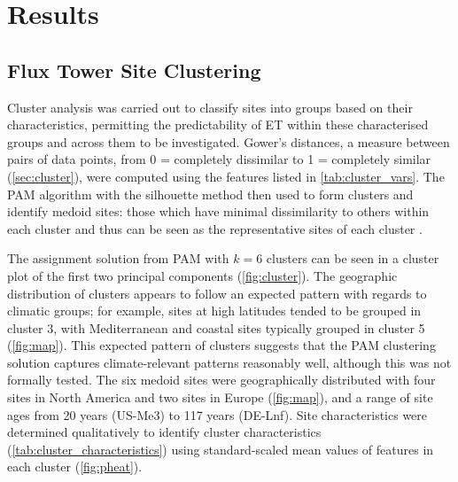 \section{Results}

\subsection{Flux Tower Site Clustering} \label{sec:cluster_res}
Cluster analysis was carried out to classify sites into groups based on their characteristics, permitting the predictability of \ac{ET} within these characterised groups and across them to be investigated. Gower's distances, a measure between pairs of data points, from 0 = completely dissimilar to 1 = completely similar \parencite{gower1971} (\ref{sec:cluster}), were computed using the features listed in \autoref{tab:cluster_vars}. The \ac{PAM} algorithm \parencite{rousseeuw1990} with the silhouette method then used to form clusters and identify medoid sites: those which have minimal dissimilarity to others within each cluster and thus can be seen as the representative sites of each cluster \parencite{schubert2021fast}.
\par The assignment solution from \ac{PAM} with $k = 6$ clusters can be seen in a cluster plot of the first two principal components (\autoref{fig:cluster}). The geographic distribution of clusters appears to follow an expected pattern with regards to climatic groups; for example, sites at high latitudes tended to be grouped in cluster 3, with Mediterranean and coastal sites typically grouped in cluster 5 (\autoref{fig:map}). This expected pattern of clusters suggests that the \ac{PAM} clustering solution captures climate-relevant patterns reasonably well, although this was not formally tested. The six medoid sites were geographically distributed with four sites in North America and two sites in Europe (\autoref{fig:map}), and a range of site ages from 20 years (US-Me3) to 117 years (DE-Lnf). Site characteristics were determined qualitatively to identify cluster characteristics (\autoref{tab:cluster_characteristics}) using standard-scaled mean values of features in each cluster (\autoref{fig:pheat}).



